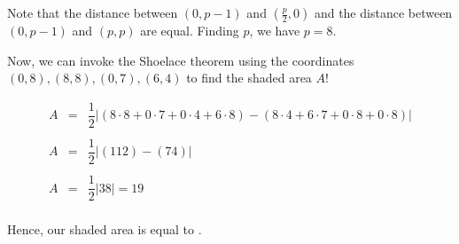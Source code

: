 \documentclass[11pt,paper=letter]{scrartcl}
\begin{document}
\begin{center}
\end{center}

Note that the distance between $(0,p-1)$ and $(\frac{p}{2}, 0)$ and the distance between $(0,p-1)$ and $(p,p)$ are equal. Finding $p$, we have $p=8$. 

Now, we can invoke the Shoelace theorem using the coordinates $(0,8), (8,8), (0,7), (6,4)$ to find the shaded area $A$! 


\begin{equation*}
  \begin{array}{lll}
    A & = & \dfrac{1}{2} 	\big |  (8\cdot8 + 0\cdot7 + 0\cdot4 + 6\cdot8)-(8\cdot4 + 6\cdot7 + 0\cdot8 + 0\cdot8) \big |    \\
    
    \\
    
    A & = & \dfrac{1}{2} 	\big | (112)-(74) 	\big |    \\
    
    \\
    
    A & = & \dfrac{1}{2} 	\big | 38 \big |  = 19   \\
     
  \end{array}
\end{equation*}


Hence, our shaded area is equal to .
\end{document}

